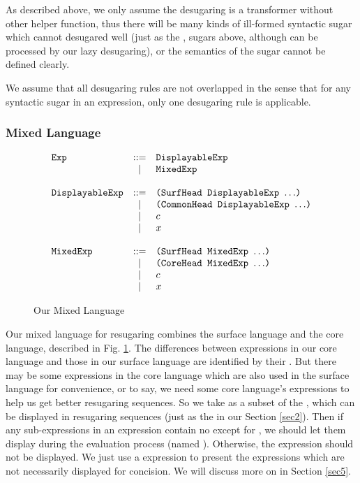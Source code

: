 As described above, we only assume the desugaring is a transformer without other helper function, thus there will be many kinds of ill-formed syntactic sugar which cannot desugared well (just as the ,  sugars above, although can be processed by our lazy desugaring), or the semantics of the sugar cannot be defined clearly.

We assume that all desugaring rules are not overlapped in the sense that for any syntactic sugar in an expression, only one desugaring rule is applicable.


\subsubsection{Mixed Language}
\begin{figure}[t]
\begin{centering}
{\footnotesize
\[
			\begin{array}{lcl}
			\mbox{\tt Exp} &::=& \mbox{\tt DisplayableExp}\\
			&|& \mbox{\tt MixedExp}\\
			\\
			\mbox{\tt DisplayableExp} &::=& \mbox{\tt (SurfHead~DisplayableExp~$\ldots$)}\\
			&|& \mbox{\tt (CommonHead~DisplayableExp~$\ldots$)}\\
			&|& c\\
			&|& x\\
			\\
			\mbox{\tt MixedExp} &::=& \mbox{\tt (SurfHead~MixedExp~$\ldots$)}\\
			&|& \mbox{\tt (CoreHead~MixedExp~$\ldots$)}\\
			&|& c\\
			&|& x\\
			\end{array}
			\]
}

\end{centering}
\caption{Our Mixed Language}
\label{fig:mix}
\end{figure}

Our mixed language for resugaring combines the surface language and the core language, described in Fig.  \ref{fig:mix}. 
%
The differences between expressions in our core language and those in our surface language are identified by their . But there may be some expressions in the core language which are also used in the surface language for convenience, or to say, we need some core language's expressions to help us get better resugaring sequences. So we take  as a subset of the , which can be displayed in resugaring sequences (just as the  in our Section \ref{sec2}). Then if any sub-expressions in an expression contain no  except for , we should let them display during the evaluation process (named ). Otherwise, the expression should not be displayed. We just use a  expression to present the expressions which are not necessarily displayed for concision. We will discuss more on   in Section \ref{sec5}.

